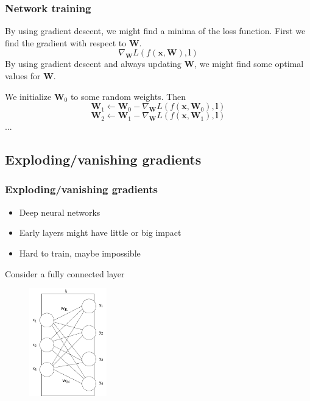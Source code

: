 \documentclass{beamer}
\begin{document}
\begin{frame}
    \frametitle{Network training}

    By using gradient descent, we might find a minima of the loss function.
    \pause
    First we find the gradient with respect to $\bm{W}$.
    $$\nabla_{\bm{W}} L(f(\bm{x}, \bm{W}), \bm{l})$$
    \pause
    By using gradient descent and always updating $\bm{W}$, we might find some optimal values for $\bm{W}$.
    \pause

    We initialize $\bm{W}_0$ to some random weights. Then
    \pause
    $$\bm{W}_1 \leftarrow \bm{W}_0 - \nabla_{\bm{W}}L(f(\bm{x}, \bm{W}_0), \bm{l})$$
    \pause
    $$\bm{W}_2 \leftarrow \bm{W}_1 - \nabla_{\bm{W}}L(f(\bm{x}, \bm{W}_1), \bm{l})$$
    ...
\end{frame}

\subsection{Exploding/vanishing gradients}

\begin{frame}
    \frametitle{Exploding/vanishing gradients}

    \begin{itemize}
        \item Deep neural networks
        \item Early layers might have little or big impact
        \item Hard to train, maybe impossible
    \end{itemize}
    Consider a fully connected layer
    \begin{figure}
        \centering
        \includegraphics[width=0.3\textwidth]{../assets/linear-layer-example.png}
    \end{figure}
\end{frame}
\end{document}
